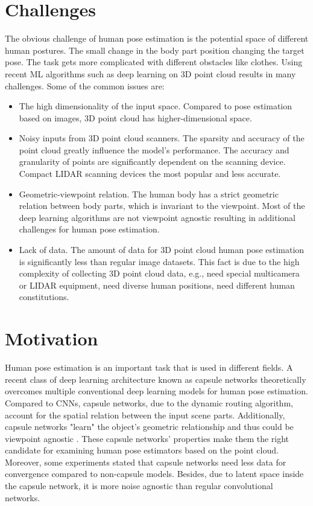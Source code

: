 \section{Challenges}
The obvious challenge of human pose estimation is the potential space of different human postures. The small change in the body part position changing the target pose. The task gets more complicated with different obstacles like clothes.
Using recent ML algorithms such as deep learning on 3D point cloud results in many challenges. Some of the common issues are:
\begin{itemize}
  \item The high dimensionality of the input space. Compared to pose estimation based on images, 3D point cloud has higher-dimensional space.
  \item Noisy inputs from 3D point cloud scanners. The sparsity and accuracy of the point cloud greatly influence the model's performance. The accuracy and granularity of points are significantly dependent on the scanning device. Compact LIDAR scanning devices the most popular and less accurate.
  \item Geometric-viewpoint relation. The human body has a strict geometric relation between body parts, which is invariant to the viewpoint. Most of the deep learning algorithms are not viewpoint agnostic resulting in additional challenges for human pose estimation.
  \item Lack of data. The amount of data for 3D point cloud human pose estimation is significantly less than regular image datasets. This fact is due to the high complexity of collecting 3D point cloud data, e.g., need special multicamera or LIDAR equipment, need diverse human positions, need different human constitutions.
\end{itemize}

\section{Motivation}
Human pose estimation is an important task that is used in different fields.
A recent class of deep learning architecture known as capsule networks \cite{sabour_dynamic_2017} theoretically overcomes multiple conventional deep learning models for human pose estimation. Compared to CNNs, capsule networks, due to the dynamic routing algorithm, account for the spatial relation between the input scene parts. Additionally, capsule networks "learn" the object's geometric relationship and thus could be viewpoint agnostic \cite{sabour_dynamic_2017}. These capsule networks' properties make them the right candidate for examining human pose estimators based on the point cloud.
Moreover, some experiments stated that capsule networks need less data for convergence compared to non-capsule models. Besides, due to latent space inside the capsule network, it is more noise agnostic than regular convolutional networks.

